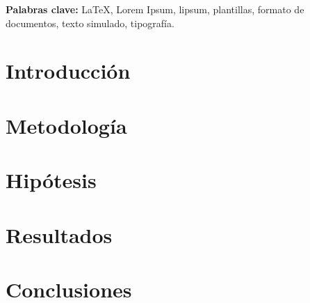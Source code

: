 \documentclass[11pt,letterpaper]{article}
\begin{document}
	\smallskip
	\noindent\textbf{Palabras clave:} \LaTeX{}, Lorem Ipsum, lipsum, plantillas, formato de documentos, texto simulado, tipografía.
	
	
	
	\section*{Introducción}
	
	\section*{Metodología}
	
	\section*{Hipótesis}
	
	\section*{Resultados}
	
	\section*{Conclusiones}
	
	\bigskip
	
	
\end{document}
